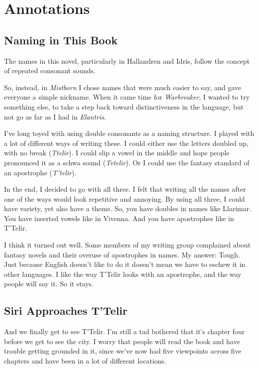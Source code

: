 \section*{Annotations}

\subsection*{Naming in This Book}

The names in this novel, particularly in Hallandren and Idris, follow the concept of repeated consonant sounds.



So, instead, in \textit{Mistborn} I chose names that were much easier to say, and gave everyone a simple nickname. When it came time for \textit{Warbreaker}, I wanted to try something else, to take a step back toward distinctiveness in the language, but not go as far as I had in \textit{Elantris}.

I’ve long toyed with using double consonants as a naming structure. I played with a lot of different ways of writing these. I could either use the letters doubled up, with no break (\textit{Ttelir}). I could slip a vowel in the middle and hope people pronounced it as a schwa sound (\textit{Tetelir}). Or I could use the fantasy standard of an apostrophe (\textit{T’telir}).

In the end, I decided to go with all three. I felt that writing all the names after one of the ways would look repetitive and annoying. By using all three, I could have variety, yet also have a theme. So, you have doubles in names like Llarimar. You have inserted vowels like in Vivenna. And you have apostrophes like in T’Telir.

I think it turned out well. Some members of my writing group complained about fantasy novels and their overuse of apostrophes in names. My answer: Tough. Just because English doesn’t like to do it doesn’t mean we have to eschew it in other languages. I like the way T’Telir looks with an apostrophe, and the way people will say it. So it stays.

\subsection*{Siri Approaches T’Telir}

And we finally get to see T’Telir. I’m still a tad bothered that it’s chapter four before we get to see the city. I worry that people will read the book and have trouble getting grounded in it, since we’ve now had five viewpoints across five chapters and have been in a lot of different locations.

